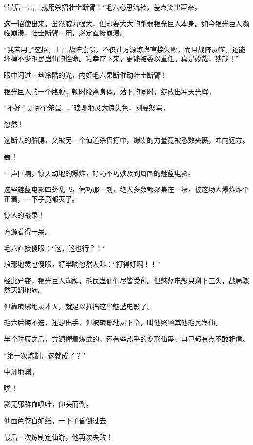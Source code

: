 \begin{this_body}
“最后一击，就用杀招壮士断臂！”毛六心思流转，差点笑出声来。

这一招使出来，虽然威力强大，但却要大大的削弱银光巨人本身。如今银光巨人濒临崩溃，壮士断臂一用，必定直接崩溃。

“我若用了这招，上古战阵崩溃，不仅让方源炼蛊直接失败，而且战阵反噬，还能坏掉不少毛民蛊仙的性命。我幸存下来，更能被委以重任。真是妙哉，妙哉！”

眼中闪过一丝冷酷的光，内奸毛六果断催动壮士断臂！

银光巨人的一个胳膊，顿时脱离身体，落下的同时，绽放出冲天光辉。

“不好！是哪个笨蛋……”琅琊地灵大惊失色，刚要怒骂。

忽然！

这断去的胳膊，又被另一个仙道杀招打中，爆发的力量竟被悉数夹裹，冲向远方。

轰！

一声巨响，惊天动地的爆炸，好巧不巧殃及到周围的魅蓝电影。

这些魅蓝电影四处乱飞，偏巧那一刻，绝大多数都聚集在一块，被这场大爆炸炸个正着，一下子竟都灭了。

惊人的战果！

方源看得一呆。

毛六直接傻眼：“这，这也行？！”

琅琊地灵也傻眼，好半晌忽然大叫：“打得好啊！！”

经此异变，银光巨人崩解，毛民蛊仙们尽皆受创。但魅蓝电影只剩下三头，战局骤然天翻地转。

但靠琅琊地灵本人，就足以抵挡这些魅蓝电影了。

毛六后悔不迭，还想出手，但被琅琊地灵下令，叫他照顾其他毛民蛊仙。

半个时辰之后，方源捧着炼成的，还有些热乎的变形仙蛊，自己都有点不敢相信。

“第一次炼制，这就成了？”

中洲地渊。

噗！

影无邪鲜血喷吐，仰头而倒。

他面色苍白如纸，一下子昏倒过去。

最后一次炼制定仙游，他再次失败！

\end{this_body}

